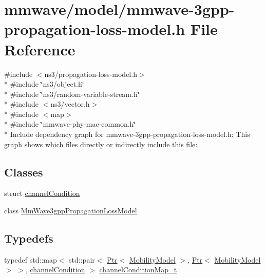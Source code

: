 \hypertarget{mmwave-3gpp-propagation-loss-model_8h}{}\section{mmwave/model/mmwave-\/3gpp-\/propagation-\/loss-\/model.h File Reference}
\label{mmwave-3gpp-propagation-loss-model_8h}
{\ttfamily \#include $<$ns3/propagation-\/loss-\/model.\+h$>$}\\*
{\ttfamily \#include \char`\"{}ns3/object.\+h\char`\"{}}\\*
{\ttfamily \#include \char`\"{}ns3/random-\/variable-\/stream.\+h\char`\"{}}\\*
{\ttfamily \#include $<$ns3/vector.\+h$>$}\\*
{\ttfamily \#include $<$map$>$}\\*
{\ttfamily \#include \char`\"{}mmwave-\/phy-\/mac-\/common.\+h\char`\"{}}\\*
Include dependency graph for mmwave-\/3gpp-\/propagation-\/loss-\/model.h\+:
This graph shows which files directly or indirectly include this file\+:
\subsection*{Classes}
\begin{DoxyCompactItemize}
\item 
struct \hyperlink{structchannelCondition}{channel\+Condition}
\item 
class \hyperlink{classMmWave3gppPropagationLossModel}{Mm\+Wave3gpp\+Propagation\+Loss\+Model}
\end{DoxyCompactItemize}
\subsection*{Typedefs}
\begin{DoxyCompactItemize}
\item 
typedef std\+::map$<$ std\+::pair$<$ \hyperlink{classns3_1_1Ptr}{Ptr}$<$ \hyperlink{classns3_1_1MobilityModel}{Mobility\+Model} $>$, \hyperlink{classns3_1_1Ptr}{Ptr}$<$ \hyperlink{classns3_1_1MobilityModel}{Mobility\+Model} $>$ $>$, \hyperlink{structchannelCondition}{channel\+Condition} $>$ \hyperlink{mmwave-3gpp-propagation-loss-model_8h_a76b21036afebb8764ee4bfe0aa80e806}{channel\+Condition\+Map\+\_\+t}
\end{DoxyCompactItemize}


